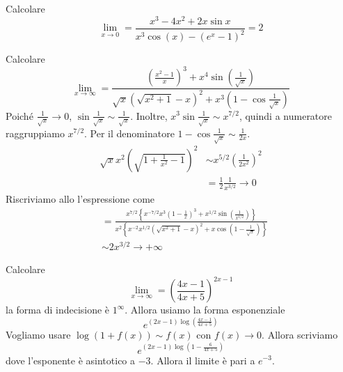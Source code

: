 \documentclass[a4paper]{article}
\begin{document}
\begin{snippetexercise}{}
    Calcolare
    \[
        \lim_{x\to 0} = \frac{x^3 -4x^2 + 2x\sin x}{x^3\cos(x) - {(e^x - 1)}^2}
        = 2
    \]
\end{snippetexercise}

\begin{snippetexercise}{}
    Calcolare
    \[
        \lim_{x\to\infty} = \frac{
            {\left(\frac{x^2-1}{x}\right)}^3 + x^4 \sin\left(\frac{1}{\sqrt{x}}\right)
        }{
            \sqrt{x} {\left(\sqrt{x^2 + 1} - x\right)}^2 + x^3\left(1 - \cos\frac{1}{\sqrt{x}}\right)
        }
    \]
    Poiché \(\frac{1}{\sqrt{x}} \to 0\), \(\sin \frac{1}{\sqrt{x}} \sim \frac{1}{\sqrt{x}}\).
    Inoltre, \(x^3\sin\frac{1}{\sqrt{x}} \sim x^{7/2}\), quindi a numeratore raggruppiamo \(x^{7/2}\).
    Per il denominatore \(1 - \cos\frac{1}{\sqrt{x}} \sim \frac{1}{2x}\).
    \begin{align*}
        \sqrt{x}x^2{(\sqrt{1 + \frac{1}{x^2} - 1})}^2 & \sim x^{5/2} {\left(\frac{1}{2x^2}\right)}^2 \\
        &= \frac{1}{2} \frac{1}{x^{3/2}} \to 0
    \end{align*}
    Riscriviamo allo l'espressione come
    \begin{align*}
        \phantom{ } &= \frac{
            x^{7/2} \left\{x^{-7/2} x^3 {\left(1 - \frac{1}{x}\right)}^3 + x^{1/2}\sin(\frac{1}{x^{1/2}})\right\}
        }{
            x^2 \left\{ x^{-2} x^{1/2} {\left(\sqrt{x^2 + 1} - x\right)}^2 + x\cos\left(1 - \frac{1}{\sqrt{x}}\right)\right\}
        } \\
        &\sim 2x^{3/2} \to +\infty
    \end{align*}
\end{snippetexercise}

\begin{snippetexercise}{}
    Calcolare
    \[
        \lim_{x\to\infty} = {\left(
            \frac{4x-1}{4x+5}
        \right)}^{2x-1}
    \]
    la forma di indecisione è \(1^\infty\).
    Allora usiamo la forma esponenziale
    \[
        e^{(2x-1) \log \left(\frac{4x-1}{4x+5}\right)}
    \]
    Vogliamo usare \(\log(1 + f(x)) \sim f(x)\) con \(f(x) \to 0\).
    Allora scriviamo
    \[
        e^{(2x-1) \log \left(1 - \frac{6}{4x+5}\right)}
    \]
    dove l'esponente è asintotico a \(-3\).
    Allora il limite è pari a \(e^{-3}\).
\end{snippetexercise}
\end{document}
